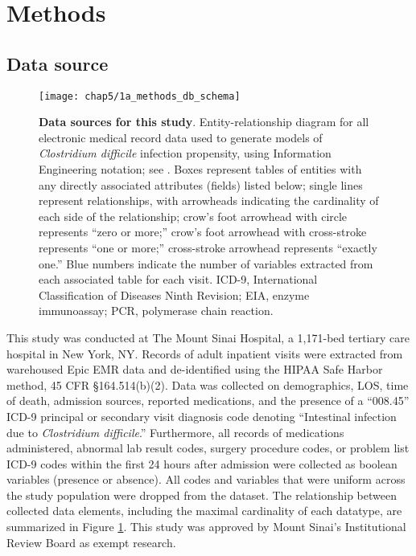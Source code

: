 \section{Methods}

\subsection{Data source}

\begin{figure}[htb]
  \texttt{[image: chap5/1a\_methods\_db\_schema]}               
  \caption[Data sources for this study]{\textbf{Data sources for this study}. Entity-relationship diagram for all electronic medical record data used to generate models of \emph{Clostridium difficile} infection propensity, using Information Engineering notation; see \textcite{Halpin2010}. Boxes represent tables of entities with any directly associated attributes (fields) listed below; single lines represent relationships, with arrowheads indicating the cardinality of each side of the relationship; crow’s foot arrowhead with circle represents “zero or more;” crow’s foot arrowhead with cross-stroke represents “one or more;” cross-stroke arrowhead represents “exactly one.” Blue numbers indicate the number of variables extracted from each associated table for each visit. ICD-9, International Classification of Diseases Ninth Revision; EIA, enzyme immunoassay; PCR, polymerase chain reaction.}
  \label{fig:db_schema}
\end{figure}

This study was conducted at The Mount Sinai Hospital, a 1,171-bed tertiary care hospital in New York, NY. Records of adult inpatient visits were extracted from warehoused Epic EMR data and de-identified using the HIPAA Safe Harbor method, 45 CFR §164.514(b)(2). Data was collected on demographics, LOS, time of death, admission sources, reported medications, and the presence of a “008.45” ICD-9 principal or secondary visit diagnosis code denoting “Intestinal infection due to \emph{Clostridium difficile}.” Furthermore, all records of medications administered, abnormal lab result codes, surgery procedure codes, or problem list ICD-9 codes within the first 24 hours after admission were collected as boolean variables (presence or absence). All codes and variables that were uniform across the study population were dropped from the dataset. The relationship between collected data elements, including the maximal cardinality of each datatype, are summarized in Figure \ref{fig:db_schema}. This study was approved by Mount Sinai’s Institutional Review Board as exempt research.

